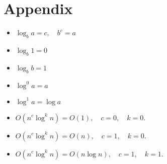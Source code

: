 \section{Appendix}

\begin{itemize}
  \item $\log_b{a} = c, \quad b^c = a$
  \item $\log_b{1} = 0$
  \item $\log_b{b} = 1$
  \item $\log^0{a} = a$
  \item $\log^1{a} = \log{a}$
  \item $O(n^c \log^k{n}) = O(1), \quad c = 0, \quad k = 0$.
  \item $O(n^c \log^k{n}) = O(n), \quad c = 1, \quad k = 0$.
  \item $O(n^c \log^k{n}) = O(n \log{n}), \quad c = 1, \quad k = 1$.
\end{itemize}
